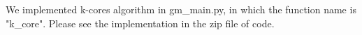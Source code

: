
We implemented k-cores algorithm in gm\_main.py, in which the function name is "k\_core". Please see the implementation in the zip file of code.  